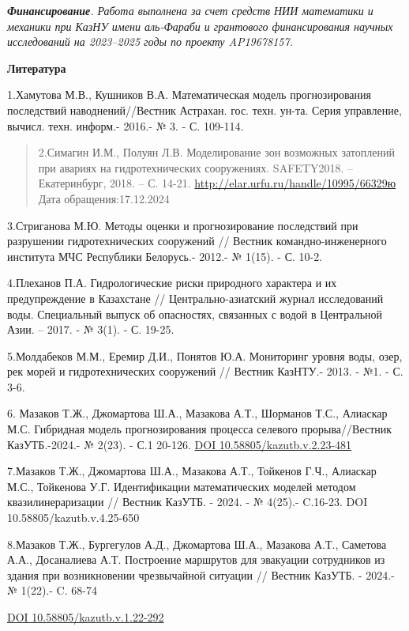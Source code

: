 \documentclass[
]{article}
\begin{document}
\emph{\textbf{Финансирование}. Работа выполнена за счет средств НИИ
математики и механики при КазНУ имени аль-Фараби и грантового
финансирования научных исследований на 2023--2025 годы по проекту
AP19678157.}

\textbf{Литература}

1.Хамутова М.В., Кушников В.А. Математическая модель прогнозирования
последствий наводнений//Вестник Астрахан. гос. техн. ун-та. Серия
управление, вычисл. техн. информ.- 2016.- № 3. - С. 109-114.

\begin{quote}
2.Симагин И.М., Полуян Л.В. Моделирование зон возможных затоплений при
авариях на гидротехнических сооружениях. SAFETY2018. -- Екатеринбург,
2018. -- С. 14-21. \url{http://elar.urfu.ru/handle/10995/66329ю} Дата
обращения:17.12.2024
\end{quote}

3.Стриганова М.Ю. Методы оценки и прогнозирование последствий при
разрушении гидротехнических сооружений // Вестник командно-инженерного
института МЧС Республики Белорусь.- 2012.- № 1(15). - С. 10-2.

4.Плеханов П.А. Гидрологические риски природного характера и их
предупреждение в Казахстане // Центрально-азиатский журнал исследований
воды. Специальный выпуск об опасностях, связанных с водой в Центральной
Азии. -- 2017. - № 3(1). - С. 19-25.

5.Молдабеков М.М., Еремир Д.И., Понятов Ю.А. Мониторинг уровня воды,
озер, рек морей и гидротехнических сооружений // Вестник КазНТУ.- 2013.
- №1. - С. 3-6.

6. Мазаков Т.Ж., Джомартова Ш.А., Мазакова А.Т., Шорманов Т.С., Алиаскар
М.С. Гибридная модель прогнозирования процесса селевого прорыва//Вестник
КазУТБ.-2024.- № 2(23). - С.1 20-126.
\href{https://doi.org/10.58805/kazutb.v.2.23-481}{DOI
10.58805/kazutb.v.2.23-481}

7.Мазаков Т.Ж., Джомартова Ш.А., Мазакова А.Т., Тойкенов Г.Ч., Алиаскар
М.С., Тойкенова У.Г. Идентификации математических моделей методом
квазилинераризации // Вестник КазУТБ. - 2024. - № 4(25).- C.16-23. DOI
10.58805/kazutb.v.4.25-650

8.Мазаков Т.Ж., Бургегулов А.Д., Джомартова Ш.А., Мазакова А.Т.,
Саметова А.А., Досаналиева А.Т. Построение маршрутов для эвакуации
сотрудников из здания при возникновении чрезвычайной ситуации // Вестник
КазУТБ. - 2024.- № 1(22).- C. 68-74

\href{https://doi.org/10.58805/kazutb.v.1.22-292}{DOI
10.58805/kazutb.v.1.22-292}
\end{document}
